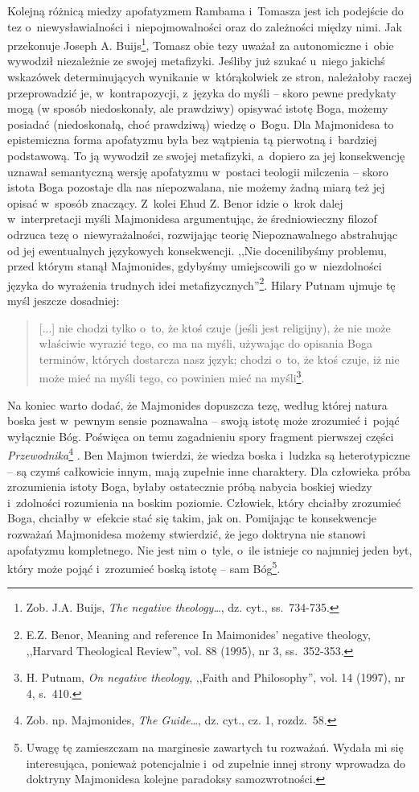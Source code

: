 Kolejną różnicą miedzy apofatyzmem Rambama i~Tomasza jest ich podejście do tez o~niewysławialności i~niepojmowalności oraz do zależności między nimi. Jak przekonuje Joseph A. Buijs\footnote{Zob. J.A. Buijs, \textit{The negative theology}…, dz. cyt., ss.~734-735.}, Tomasz obie tezy uważał za autonomiczne i~obie wywodził niezależnie ze swojej metafizyki. Jeśliby już szukać u~niego jakichś wskazówek determinujących wynikanie w~którąkolwiek ze stron, należałoby raczej przeprowadzić je, w~kontrapozycji, z~języka do myśli -- skoro pewne predykaty mogą (w sposób niedoskonały, ale prawdziwy) opisywać istotę Boga, możemy posiadać (niedoskonałą, choć prawdziwą) wiedzę o~Bogu. Dla Majmonidesa to epistemiczna forma apofatyzmu była bez wątpienia tą pierwotną i~bardziej podstawową. To ją wywodził ze swojej metafizyki, a~dopiero za jej konsekwencję uznawał semantyczną wersję apofatyzmu w~postaci teologii milczenia -- skoro istota Boga pozostaje dla nas niepozwalana, nie możemy żadną miarą też jej opisać w~sposób znaczący. Z~kolei Ehud Z. Benor idzie o~krok dalej w~interpretacji myśli Majmonidesa argumentując, że średniowieczny filozof odrzuca tezę o~niewyrażalności, rozwijając teorię Niepoznawalnego abstrahując od jej ewentualnych językowych konsekwencji. ,,Nie docenilibyśmy problemu, przed którym stanął Majmonides, gdybyśmy umiejscowili go w~niezdolności języka do wyrażenia trudnych idei metafizycznych''\footnote{E.Z. Benor, Meaning and reference In Maimonides' negative theology, ,,Harvard Theological Review'', vol. 88 (1995), nr 3, ss.~352-353.}. Hilary Putnam ujmuje tę myśl jeszcze dosadniej:

\begin{quote}
[...] nie chodzi tylko o~to, że ktoś czuje (jeśli jest religijny), że nie może właściwie wyrazić tego, co ma na myśli, używając do opisania Boga terminów, których dostarcza nasz język; chodzi o~to, że ktoś czuje, iż nie może mieć na myśli tego, co powinien mieć na myśli\footnote{H. Putnam, \textit{On negative theology}, ,,Faith and Philosophy'', vol. 14 (1997), nr 4, s.~410.}.
\end{quote}

Na koniec warto dodać, że Majmonides dopuszcza tezę, według której natura boska jest w~pewnym sensie poznawalna -- swoją istotę może zrozumieć i~pojąć wyłącznie Bóg. Poświęca on temu zagadnieniu spory fragment pierwszej części \textit{Przewodnika}\footnote{Zob. np. Majmonides, \textit{The Guide}…, dz. cyt., cz. 1, rozdz.~58.}
. Ben Majmon twierdzi, że wiedza boska i~ludzka są heterotypiczne -- są czymś całkowicie innym, mają zupełnie inne charaktery. Dla człowieka próba zrozumienia istoty Boga, byłaby ostatecznie próbą nabycia boskiej wiedzy i~zdolności rozumienia na boskim poziomie. Człowiek, który chciałby zrozumieć Boga, chciałby w~efekcie stać się takim, jak on. Pomijając te konsekwencje rozważań Majmonidesa możemy stwierdzić, że jego doktryna nie stanowi apofatyzmu kompletnego. Nie jest nim o~tyle, o~ile istnieje co najmniej jeden byt, który może pojąć i~zrozumieć boską istotę -- sam Bóg\footnote{Uwagę tę zamieszczam na marginesie zawartych tu rozważań. Wydała mi się interesująca, ponieważ potencjalnie i~od zupełnie innej strony wprowadza do doktryny Majmonidesa kolejne paradoksy samozwrotności.}.


